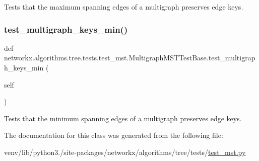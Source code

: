 \begin{DoxyVerb}Tests that the maximum spanning edges of a multigraph
preserves edge keys.\end{DoxyVerb}
 \mbox{\label{classnetworkx_1_1algorithms_1_1tree_1_1tests_1_1test__mst_1_1MultigraphMSTTestBase_a189c86fd34a325d17a58d54596292e2c}} 
\subsubsection{\texorpdfstring{test\+\_\+multigraph\+\_\+keys\+\_\+min()}{test\_multigraph\_keys\_min()}}
{\footnotesize\ttfamily def networkx.\+algorithms.\+tree.\+tests.\+test\+\_\+mst.\+Multigraph\+M\+S\+T\+Test\+Base.\+test\+\_\+multigraph\+\_\+keys\+\_\+min (\begin{DoxyParamCaption}\item[{}]{self }\end{DoxyParamCaption})}

\begin{DoxyVerb}Tests that the minimum spanning edges of a multigraph
preserves edge keys.\end{DoxyVerb}
 

The documentation for this class was generated from the following file\+:\begin{DoxyCompactItemize}
\item 
venv/lib/python3./site-\/packages/networkx/algorithms/tree/tests/\hyperlink{test__mst_8py}{test\+\_\+mst.\+py}\end{DoxyCompactItemize}
